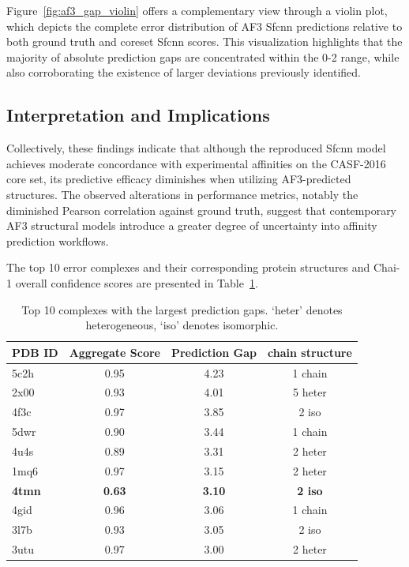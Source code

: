 \documentclass[unnumsec,webpdf,contemporary,large]{oup-authoring-template}
\theoremstyle{thmstyleone}%
\theoremstyle{thmstyletwo}%
\theoremstyle{thmstylethree}%
\begin{document}
Figure~\ref{fig:af3_gap_violin} offers a complementary view through a violin plot, which depicts the complete error distribution of AF3 Sfcnn predictions relative to both ground truth and coreset Sfcnn scores. 
This visualization highlights that the majority of absolute prediction gaps are concentrated within the 0-2 range, while also corroborating the existence of larger deviations previously identified.

\subsection{Interpretation and Implications}
Collectively, these findings indicate that although the reproduced Sfcnn model 
achieves moderate concordance with experimental affinities on the CASF-2016 core set, 
its predictive efficacy diminishes when utilizing AF3-predicted structures. 
The observed alterations in performance metrics, notably the diminished Pearson correlation against ground truth, 
suggest that contemporary AF3 structural models introduce a greater degree of uncertainty into affinity 
prediction workflows.

The top 10 error complexes and their corresponding protein structures and Chai-1 overall confidence scores
are presented in Table~\ref{tab:top10_error}.

\begin{table}[H]
\centering
\caption{Top 10 complexes with the largest prediction gaps.
`heter' denotes heterogeneous, `iso' denotes isomorphic.}
\label{tab:top10_error}
\begin{tabular}{lccc}
\toprule
PDB ID & Aggregate Score & Prediction Gap & chain structure\\
\midrule
5c2h & 0.95 & 4.23 & 1 chain\\
2x00 & 0.93 & 4.01 & 5 heter\\
4f3c & 0.97 & 3.85 & 2 iso\\
5dwr & 0.90 & 3.44 & 1 chain\\
4u4s & 0.89 & 3.31 & 2 heter\\
1mq6 & 0.97 & 3.15 & 2 heter\\
\textbf{4tmn} & \textbf{0.63} & \textbf{3.10} & \textbf{2 iso}\\
4gid & 0.96 & 3.06 & 1 chain\\
3l7b & 0.93 & 3.05 & 2 iso\\
3utu & 0.97 & 3.00 & 2 heter\\
\bottomrule
\end{tabular}
\end{table}
\end{document}
